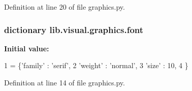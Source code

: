 Definition at line 20 of file graphics.\-py.

\hypertarget{a00150_a3c83ccb4d4d1fcb0ea5f6b8616a1d0df}{
\subsubsection[{font}]{\setlength{\rightskip}{0pt plus 5cm}dictionary lib.\-visual.\-graphics.\-font}}\label{a00150_a3c83ccb4d4d1fcb0ea5f6b8616a1d0df}
{\bfseries Initial value\-:}
\begin{DoxyCode}
1 = \{\textcolor{stringliteral}{'family'} : \textcolor{stringliteral}{'serif'},
2         \textcolor{stringliteral}{'weight'} : \textcolor{stringliteral}{'normal'},
3         \textcolor{stringliteral}{'size'}   : 10,
4         \}
\end{DoxyCode}


Definition at line 14 of file graphics.\-py.

